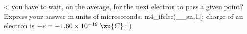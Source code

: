 <%
you have to wait, on the average, for the next electron to
pass a given point? Express your answer in units of microseconds.
m4_ifelse(__sn,1,[:%
charge of an electron is $-e=-1.60\times10^{-19}\ \zu{C}$.:])

